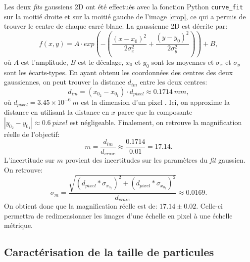 \documentclass[11pt,letterpaper]{article}
\begin{document}
Les deux \textit{fits} gaussiens 2D ont été effectués avec la fonction Python \texttt{curve\_fit} sur la moitié droite et sur la moitié gauche de l'image \ref{crop},
ce qui a permis de trouver le centre de chaque carré blanc. La gaussienne 2D est décrite par:
\begin{equation}
  f(x,y)=A\cdot exp\left(-\left(\frac{(x-x_0)^2}{2\sigma_x^2}+\frac{(y-y_0)^2}{2\sigma_y^2}\right)\right)+B,
\end{equation}
où $A$ est l'amplitude, $B$ est le décalage, $x_0$ et $y_0$ sont les moyennes et $\sigma_x$ et $\sigma_y$ sont les écarts-types.
En ayant obtenu les coordonnées des centres des deux gaussiennes, on peut trouver la distance $d_{im}$ entre les deux centres:
\begin{equation}
  d_{im}=(x_{0_2}-x_{0_1})\cdot d_{pixel}\approx 0.1714\ mm,
\end{equation}
où $d_{pixel}=3.45\times10^{-6} \ m$ est la dimension d'un pixel \cite{noauthor_thorlabs_2024-1}. Ici, on approxime la distance en utilisant la distance en $x$
parce que la composante $|y_{0_2}-y_{0_1}|\approx 0.6\ pixel$ est négligeable. Finalement, on retrouve la magnification réelle de l'objectif:
\begin{equation}
  m=\frac{d_{im}}{d_{vraie}}\approx\frac{0.1714}{0.01}= 17.14.
\end{equation}
L'incertitude sur $m$ provient des incertitudes sur les paramètres du \textit{fit} gaussien. 
On retrouve:
\begin{equation}
  \sigma_m=\frac{\sqrt{(d_{pixel}*\sigma_{x_{0_2}})^2+(d_{pixel}*\sigma_{x_{0_2}})^2}}{d_{vraie}}\approx0.0169.
\end{equation}
On obtient donc que la magnification réelle est de: $17.14\pm0.02$. Celle-ci permettra de redimensionner les images d'une échelle en pixel à une échelle métrique.


\subsection{Caractérisation de la taille de particules}
\end{document}
